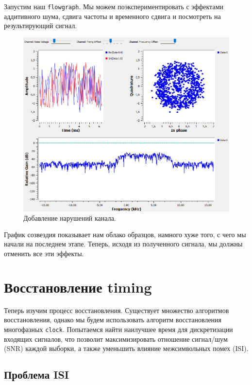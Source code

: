 \documentclass[a4paper, 14pt]{extarticle}
\begin{document}
    Запустим наш \texttt{flowgraph}.
    Мы можем поэкспериментировать с эффектами аддитивного шума, сдвига частоты и временного сдвига и посмотреть
    на результирующий сигнал.

    \begin{figure}[h]
        \centering
        \includegraphics[width=0.8\linewidth]{resources/Images/task2_adding_channel_impairments}
        \caption{Добавление нарушений канала.}
        \label{fig:task2_mpsk_stage2}
    \end{figure}

    График созвездия показывает нам облако образцов, намного хуже того, с чего мы начали на последнем этапе.
    Теперь, исходя из полученного сигнала, мы должны отменить все эти эффекты.

    \newpage

    \section{Восстановление timing}
    \label{sec:task3}

    Теперь изучим процесс восстановления.
    Существует множество алгоритмов восстановления, однако мы будем использовать алгоритм восстановления
    многофазных \texttt{clock}. 
    Попытаемся найти наилучшее время для дискретизации входящих сигналов, что позволит максимизировать отношение
    сигнал/шум (SNR) каждой выборки, а также уменьшить влияние межсимвольных помех (ISI).
    
    \subsection{Проблема ISI}
    \label{subsec:task3_isi}
\end{document}
